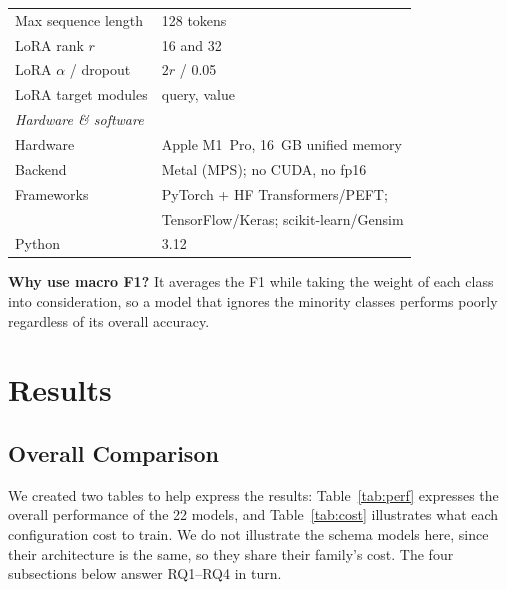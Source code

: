 \documentclass[conference]{IEEEtran}
\begin{document}
\begin{table}[t]
\begin{tabular}{ll}
    Max sequence length & 128 tokens \\
    LoRA rank $r$       & 16 and 32 \\
    LoRA $\alpha$ / dropout & $2r$ / 0.05 \\
    LoRA target modules & query, value \\
    \midrule
    \multicolumn{2}{l}{\textit{Hardware \& software}}\\
    Hardware            & Apple M1~Pro, 16~GB unified memory \\
    Backend             & Metal (MPS); no CUDA, no fp16 \\
    Frameworks          & PyTorch + HF Transformers/PEFT; \\
                        & TensorFlow/Keras; scikit-learn/Gensim \\
    Python              & 3.12 \\
    \bottomrule
  \end{tabular}
\end{table}

\textbf{Why use macro F1?} It averages the F1 while taking the weight of each class
into consideration, so a model that ignores the minority classes performs poorly regardless of its overall
accuracy.
\section{Results}

\subsection{Overall Comparison}
We created two tables to help express the results: Table~\ref{tab:perf} expresses
the overall performance of the 22 models, and Table~\ref{tab:cost} illustrates what
each configuration cost to train. We do not illustrate the schema models here, since
their architecture is the same, so they share their family's cost. The four subsections
below answer RQ1--RQ4 in turn.
\end{document}
